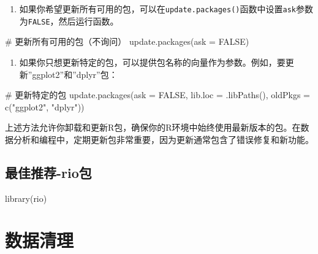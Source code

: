 \documentclass[
  letterpaper,
  DIV=11,
  numbers=noendperiod]{scrreprt}
\newenvironment{Shaded}{\begin{snugshade}}{\end{snugshade}}
\newcommand{\AttributeTok}[1]{\textcolor[rgb]{0.40,0.45,0.13}{#1}}
\newcommand{\CommentTok}[1]{\textcolor[rgb]{0.37,0.37,0.37}{#1}}
\newcommand{\ConstantTok}[1]{\textcolor[rgb]{0.56,0.35,0.01}{#1}}
\newcommand{\FunctionTok}[1]{\textcolor[rgb]{0.28,0.35,0.67}{#1}}
\newcommand{\NormalTok}[1]{\textcolor[rgb]{0.00,0.23,0.31}{#1}}
\newcommand{\StringTok}[1]{\textcolor[rgb]{0.13,0.47,0.30}{#1}}
\providecommand{\tightlist}{%
  \setlength{\itemsep}{0pt}\setlength{\parskip}{0pt}}\usepackage{longtable,booktabs,array}
\begin{document}
\begin{enumerate}
\def\labelenumi{\arabic{enumi}.}
\setcounter{enumi}{1}
\tightlist
\item
  如果你希望更新所有可用的包，可以在\texttt{update.packages()}函数中设置\texttt{ask}参数为\texttt{FALSE}，然后运行函数。
\end{enumerate}

\begin{Shaded}
\begin{Highlighting}[]
\CommentTok{\# 更新所有可用的包（不询问）}
\FunctionTok{update.packages}\NormalTok{(}\AttributeTok{ask =} \ConstantTok{FALSE}\NormalTok{)}
\end{Highlighting}
\end{Shaded}

\begin{enumerate}
\def\labelenumi{\arabic{enumi}.}
\setcounter{enumi}{2}
\tightlist
\item
  如果你只想更新特定的包，可以提供包名称的向量作为参数。例如，要更新''ggplot2''和''dplyr''包：
\end{enumerate}

\begin{Shaded}
\begin{Highlighting}[]
\CommentTok{\# 更新特定的包}
\FunctionTok{update.packages}\NormalTok{(}\AttributeTok{ask =} \ConstantTok{FALSE}\NormalTok{, }\AttributeTok{lib.loc =} \FunctionTok{.libPaths}\NormalTok{(), }\AttributeTok{oldPkgs =} \FunctionTok{c}\NormalTok{(}\StringTok{"ggplot2"}\NormalTok{, }\StringTok{"dplyr"}\NormalTok{))}
\end{Highlighting}
\end{Shaded}

上述方法允许你卸载和更新R包，确保你的R环境中始终使用最新版本的包。在数据分析和编程中，定期更新包非常重要，因为更新通常包含了错误修复和新功能。

\hypertarget{ux6700ux4f73ux63a8ux8350-rioux5305}{%
\chapter{最佳推荐-rio包}\label{ux6700ux4f73ux63a8ux8350-rioux5305}}

\begin{Shaded}
\begin{Highlighting}[]
\FunctionTok{library}\NormalTok{(rio)}
\end{Highlighting}
\end{Shaded}

\part{数据清理}
\end{document}
